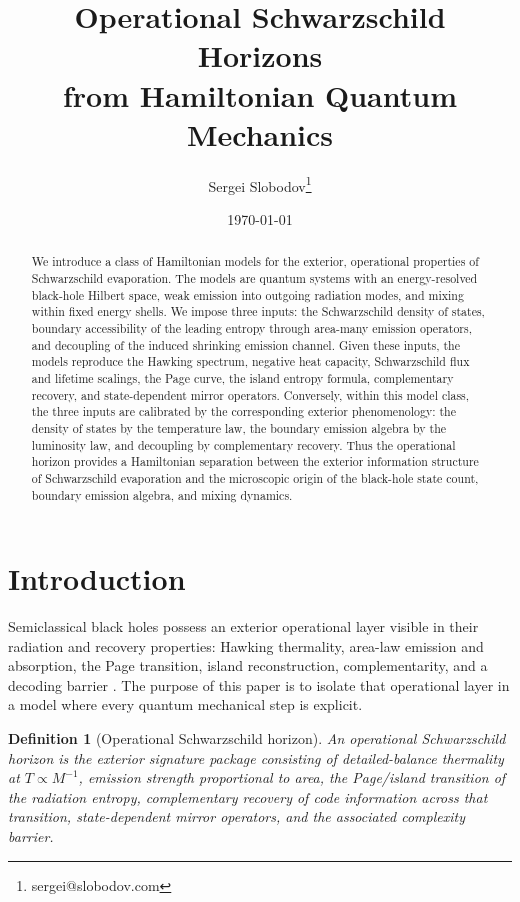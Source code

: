\documentclass[12pt]{article}
\title{Operational Schwarzschild Horizons\\ from Hamiltonian Quantum Mechanics}
\author{Sergei Slobodov\thanks{sergei@slobodov.com}}
\date{\today}
\newtheorem{definition}{Definition}
\begin{document}
\begin{titlingpage}
\maketitle

\begin{abstract}
We introduce a class of Hamiltonian models for the exterior, operational
properties of Schwarzschild evaporation.  The models are quantum systems with
an energy-resolved black-hole Hilbert space, weak emission into outgoing
radiation modes, and mixing within fixed energy shells.  We impose
three inputs: the Schwarzschild density of states, boundary accessibility of
the leading entropy through area-many emission operators, and decoupling of the
induced shrinking emission channel.  Given these inputs, the models reproduce
the Hawking spectrum, negative heat capacity, Schwarzschild flux and lifetime
scalings, the Page curve, the island entropy formula, complementary recovery,
and state-dependent mirror operators.  Conversely, within this model class, the
three inputs are calibrated by the corresponding exterior phenomenology: the
density of states by the temperature law, the boundary emission algebra by the
luminosity law, and decoupling by complementary recovery.  Thus the operational
horizon provides a Hamiltonian separation between the exterior information
structure of Schwarzschild evaporation and the microscopic origin of the
black-hole state count, boundary emission algebra, and mixing dynamics.
\end{abstract}
\end{titlingpage}

\section{Introduction}

Semiclassical black holes possess an exterior operational layer visible in
their radiation and recovery properties: Hawking thermality, area-law emission
and absorption, the Page transition, island reconstruction, complementarity,
and a decoding barrier
\cite{Hawking1975,Page1993Average,Penington2019,HaydenPreskill2007,
HarlowHayden2013}.  The purpose of this paper is to isolate that operational
layer in a model where every quantum mechanical step is explicit.

\begin{definition}[Operational Schwarzschild horizon]
An operational Schwarzschild horizon is the exterior signature package
consisting of detailed-balance thermality at $T\propto M^{-1}$, emission
strength proportional to area, the Page/island transition of the radiation
entropy, complementary recovery of code information across that transition,
state-dependent mirror operators, and the associated complexity barrier.
\end{definition}
\end{document}
